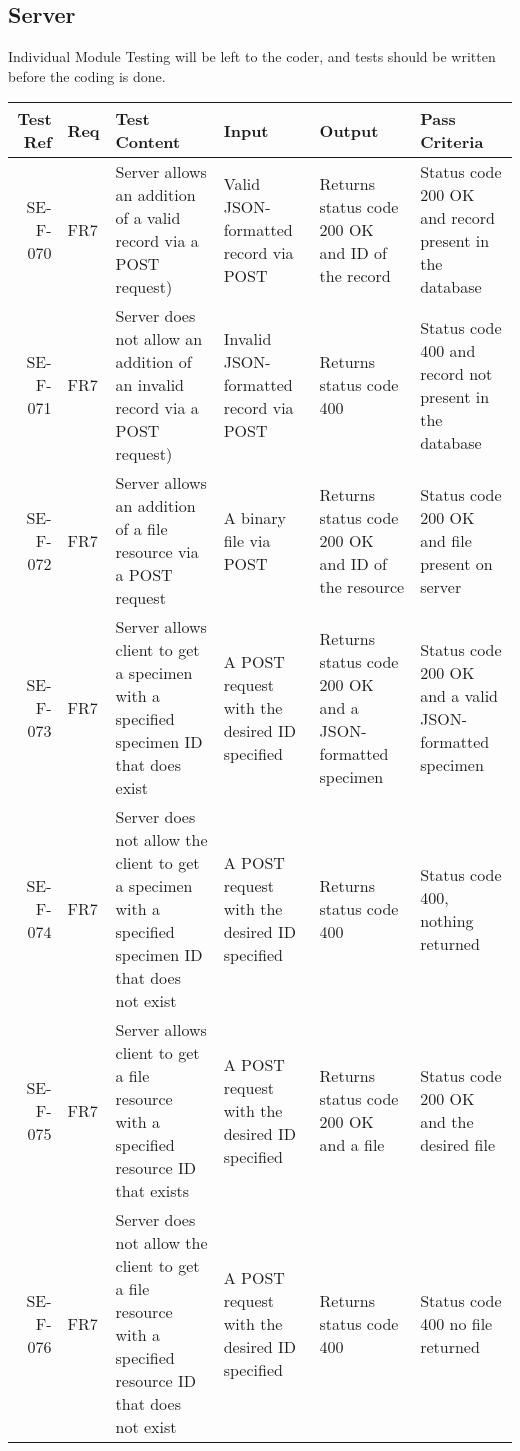 \subsection{Server}
    Individual Module Testing will be left to the coder, and tests should be written before the coding is done.

    \begin{landscape}
        \begin{longtable}{|r|l|p{4cm}|p{4cm}|p{4cm}|p{4cm}|}
        \hline
        Test Ref & Req & Test Content & Input & Output & Pass Criteria \\ \hline
        SE-F-070 & FR7 & Server allows an addition of a valid record via a POST request) & Valid JSON-formatted record via POST & Returns status code 200 OK and ID of the record & Status code 200 OK and record present in the database \\ \hline
        SE-F-071 & FR7 & Server does not allow an addition of an invalid record via a POST request) & Invalid JSON-formatted record via POST & Returns status code 400 & Status code 400 and record not present in the database \\ \hline
        SE-F-072 & FR7 & Server allows an addition of a file resource via a POST request & A binary file via POST & Returns status code 200 OK and ID of the resource & Status code 200 OK and file present on server \\ \hline
        SE-F-073 & FR7 & Server allows client to get a specimen with a specified specimen ID that does exist& A POST request with the desired ID specified & Returns status code 200 OK and a JSON-formatted specimen & Status code 200 OK and a valid JSON-formatted specimen \\ \hline
        SE-F-074 & FR7 & Server does not allow the client to get a specimen with a specified specimen ID that does not exist & A POST request with the desired ID specified & Returns status code 400 & Status code 400, nothing returned  \\ \hline
        SE-F-075 & FR7 & Server allows client to get a file resource with a specified resource ID that exists & A POST request with the desired ID specified & Returns status code 200 OK and a file & Status code 200 OK and the desired file \\ \hline
        SE-F-076 & FR7 & Server does not allow the client to get a file resource with a specified resource ID that does not exist & A POST request with the desired ID specified & Returns status code 400 & Status code 400 no file returned \\ \hline

\end{longtable}
\end{landscape}
